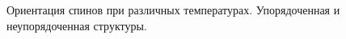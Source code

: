 \documentclass[oneside,final,14pt]{extarticle}
\begin{document}
	\begin{figure}[h]
		\centering
		\qquad
		\caption{Ориентация спинов при различных температурах. Упорядоченная и неупорядоченная структуры.}
		\label{ris:orient}
	\end{figure}
	
\end{document}
